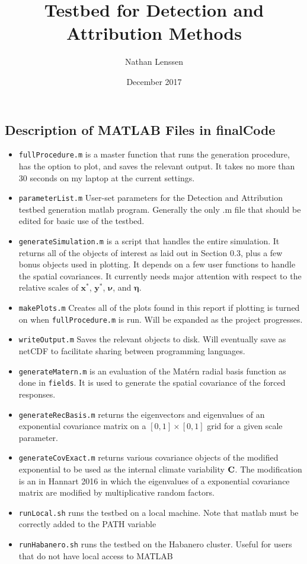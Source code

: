 \documentclass[12pt]{article}
\title{Testbed for Detection and Attribution Methods}
\author{Nathan Lenssen}
\date{December 2017}
\newcommand{\C}{\ensuremath{\text{Cov}}}
\def\*#1{\bm{#1}}
\def\C{\textbf{\text{C}}}
\begin{document}
\maketitle

\subsection{Description of MATLAB Files in finalCode}
\begin{itemize}
\item \texttt{fullProcedure.m} is a master function that runs the generation procedure, has the option to plot, and saves the relevant output. It takes no more than 30 seconds on my laptop at the current settings.

\item \texttt{parameterList.m} User-set parameters for the Detection and Attribution testbed generation matlab program. Generally the only .m file that should be edited for basic use of the testbed.

\item \texttt{generateSimulation.m} is a script that handles the entire simulation. It returns all of the objects of interest as laid out in Section 0.3, plus a few bonus objects used in plotting. It depends on a few user functions to handle the spatial covariances. It currently needs major attention with respect to the relative scales of $\*x^*$,  $\*y^*$, $\*\nu$, and $\*\eta$.

\item \texttt{makePlots.m} Creates all of the plots found in this report if plotting is turned on when \texttt{fullProcedure.m} is run. Will be expanded as the project progresses.

\item \texttt{writeOutput.m} Saves the relevant objects to disk. Will eventually save as netCDF to facilitate sharing between programming languages.

\item \texttt{generateMatern.m} is an evaluation of the Mat\'ern radial basis function as done in \texttt{fields}. It is used to generate the spatial covariance of the forced responses.

\item \texttt{generateRecBasis.m} returns the eigenvectors and eigenvalues of an exponential covariance matrix on a $[0,1] \times [0,1]$ grid for a given scale parameter.

\item \texttt{generateCovExact.m} returns various covariance objects of the modified exponential to be used as the internal climate variability $\C$. The modification is an in Hannart 2016 in which the eigenvalues of a exponential covariance matrix are modified by multiplicative random factors.

\item \texttt{runLocal.sh} runs the testbed on a local machine. Note that matlab must be correctly added to the PATH variable

\item \texttt{runHabanero.sh} runs the testbed on the Habanero cluster. Useful for users that do not have local access to MATLAB
\end{itemize} 
\end{document}
